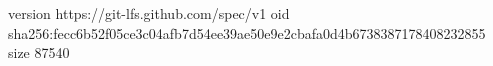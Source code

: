 version https://git-lfs.github.com/spec/v1
oid sha256:fecc6b52f05ce3c04afb7d54ee39ae50e9e2cbafa0d4b6738387178408232855
size 87540
